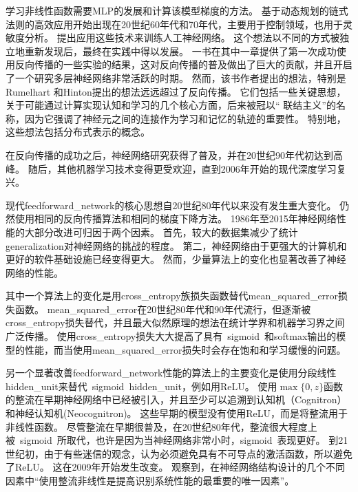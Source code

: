 学习非线性函数需要\gls{MLP}的发展和计算该模型梯度的方法。
基于动态规划的链式法则的高效应用开始出现在20世纪60年代和70年代，主要用于控制领域\citep{Kelley-1960,Bryson-et-al-1961,Dreyfus-1962,Bryson-1969,Dreyfus-1973}，也用于灵敏度分析\citep{Linnainmaa-1976}。 
\cite{Werbos-1981}提出应用这些技术来训练人工神经网络。
这个想法以不同的方式被独立地重新发现后\citep{LeCun85,Parker-1985,Rumelhart86b-small}，最终在实践中得以发展。
一书在其中一章提供了第一次成功使用反向传播的一些实验的结果\citep{Rumelhart86c}，这对反向传播的普及做出了巨大的贡献，并且开启了一个研究多层神经网络非常活跃的时期。
然而，该书作者提出的想法，特别是Rumelhart 和Hinton提出的想法远远超过了反向传播。
它们包括一些关键思想，关于可能通过计算实现认知和学习的几个核心方面，后来被冠以`` 联结主义''的名称，因为它强调了神经元之间的连接作为学习和记忆的轨迹的重要性。
特别地，这些想法包括分布式表示的概念\citep{Hinton-et-al-PDP1986}。

在反向传播的成功之后，神经网络研究获得了普及，并在20世纪90年代初达到高峰。 
随后，其他机器学习技术变得更受欢迎，直到2006年开始的现代深度学习复兴。

现代\gls{feedforward_network}的核心思想自20世纪80年代以来没有发生重大变化。
仍然使用相同的反向传播算法和相同的梯度下降方法。
1986年至2015年神经网络性能的大部分改进可归因于两个因素。
首先，较大的数据集减少了统计\gls{generalization}对神经网络的挑战的程度。
第二，神经网络由于更强大的计算机和更好的软件基础设施已经变得更大。
然而，少量算法上的变化也显著改善了神经网络的性能。
  
  
其中一个算法上的变化是用\gls{cross_entropy}族损失函数替代\gls{mean_squared_error}损失函数。
\gls{mean_squared_error}在20世纪80年代和90年代流行，但逐渐被\gls{cross_entropy}损失替代，并且最大似然原理的想法在统计学界和机器学习界之间广泛传播。
使用\gls{cross_entropy}损失大大提高了具有~\gls{sigmoid}~和softmax输出的模型的性能，而当使用\gls{mean_squared_error}损失时会存在饱和和学习缓慢的问题。

另一个显著改善\gls{feedforward_network}性能的算法上的主要变化是使用分段线性\gls{hidden_unit}来替代~\gls{sigmoid}~\gls{hidden_unit}，例如用\gls{ReLU}。
使用$\max\{0, z\}$函数的整流在早期神经网络中已经被引入，并且至少可以追溯到认知机（Cognitron）和神经认知机(Neocognitron)\citep{Fukushima75,Fukushima80}。
这些早期的模型没有使用\gls{ReLU}，而是将整流用于非线性函数。
尽管整流在早期很普及，在20世纪80年代，整流很大程度上被~\gls{sigmoid}~所取代，也许是因为当神经网络非常小时，\gls{sigmoid}~表现更好。
到21世纪初，由于有些迷信的观念，认为必须避免具有不可导点的激活函数，所以避免了\gls{ReLU}。
这在2009年开始发生改变。
\cite{Jarrett-ICCV2009-small}观察到，在神经网络结构设计的几个不同因素中``使用整流非线性是提高识别系统性能的最重要的唯一因素''。

